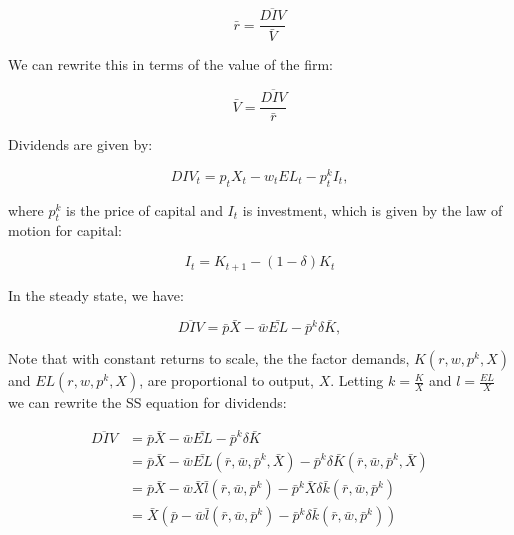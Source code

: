 \documentclass[letterpaper,12pt]{article}
\theoremstyle{definition}
\begin{document}
\begin{spacing}{1.5}
\begin{equation}
\label{eqn:equity_return}
\bar{r} = \frac{\overline{DIV}}{\bar{V}}
\end{equation} 

We can rewrite this in terms of the value of the firm:

\begin{equation}
\label{eqn:firm_val_ss}
\bar{V} = \frac{\overline{DIV}}{\bar{r}}
\end{equation} 


Dividends are given by:

\begin{equation}
DIV_{t} = p_{t}X_{t} - w_{t}EL_{t} - p^{k}_{t}I_{t},
\end{equation}

\noindent\noindent where $p^{k}_{t}$ is the price of capital and $I_{t}$ is investment, which is given by the law of motion for capital:

\begin{equation}
I_{t} = K_{t+1}-(1-\delta)K_{t}
\end{equation}

In the steady state, we have:

\begin{equation}
\label{eqn:ssDIV}
\overline{DIV} = \bar{p}\bar{X} - \bar{w}\bar{EL} - \bar{p}^{k}\delta\bar{K},
\end{equation}

\noindent\noindent Note that with constant returns to scale, the the factor demands, $K(r,w,p^{k},X)$ and $EL(r,w,p^{k},X)$, are proportional to output, $X$.  Letting $k=\frac{K}{X}$ and $l=\frac{EL}{X}$ we can rewrite the SS equation for dividends:

\begin{equation}
\begin{split}
\label{eqn:ssDIV_decomposed}
\overline{DIV} & = \bar{p}\bar{X} - \bar{w}\bar{EL} - \bar{p}^{k}\delta\bar{K} \\
&  = \bar{p}\bar{X} - \bar{w}\bar{EL}(\bar{r},\bar{w},\bar{p}^{k},\bar{X}) - \bar{p}^{k}\delta\bar{K}(\bar{r},\bar{w},\bar{p}^{k},\bar{X}) \\
& = \bar{p}\bar{X} - \bar{w}\bar{X}\bar{l}(\bar{r},\bar{w},\bar{p}^{k}) - \bar{p}^{k}\bar{X}\delta\bar{k}(\bar{r},\bar{w},\bar{p}^{k}) \\
& = \bar{X}\left(\bar{p} - \bar{w}\bar{l}(\bar{r},\bar{w},\bar{p}^{k}) - \bar{p}^{k}\delta\bar{k}(\bar{r},\bar{w},\bar{p}^{k})\right) \\
\end{split}
\end{equation}


\end{spacing}
\end{document}
